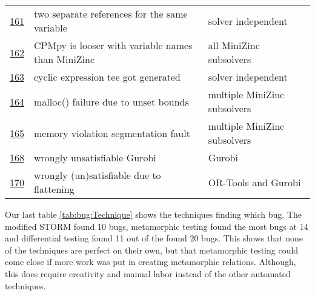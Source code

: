 \begin{table}[]
\begin{tabular}{lll}
		\href{https://github.com/CPMpy/cpmpy/issues/161}{161} & two separate references for the same variable     & solver independent           \\
		\href{https://github.com/CPMpy/cpmpy/issues/162}{162} & CPMpy is looser with variable names than MiniZinc & all MiniZinc subsolvers      \\
		\href{https://github.com/CPMpy/cpmpy/issues/163}{163} & cyclic expression tee got generated               & solver independent           \\
		\href{https://github.com/CPMpy/cpmpy/issues/164}{164} & malloc() failure due to unset bounds              & multiple MiniZinc subsolvers \\
		\href{https://github.com/CPMpy/cpmpy/issues/165}{165} & memory violation segmentation fault               & multiple MiniZinc subsolvers \\
		\href{https://github.com/CPMpy/cpmpy/issues/168}{168} & wrongly unsatisfiable Gurobi                      & Gurobi                       \\
		\href{https://github.com/CPMpy/cpmpy/issues/170}{170} & wrongly (un)satisfiable due to flattening         & OR-Tools and Gurobi          \\ \bottomrule
	\end{tabular}
\end{table}

Our last table \ref{tab:bug:Technique} shows the techniques finding which bug. The modified STORM found 10 bugs, metamorphic testing found the most bugs at 14 and differential testing found 11 out of the found 20 bugs. This shows that none of the techniques are perfect on their own, but that metamorphic testing could come close if more work was put in creating metamorphic relations. Although, this does require creativity and manual labor instead of the other automated techniques.

